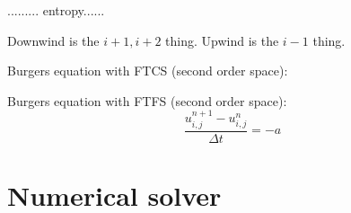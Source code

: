 \documentclass{article}
\begin{document}
......... entropy......


Downwind is the $i+1, i+2$ thing. Upwind is the $i-1$ thing.


Burgers equation with FTCS (second order space):

Burgers equation with FTFS (second order space):
\begin{equation}
    \frac{u_{i,j}^{n+1}-u_{i,j}^n}{\Delta t} = -a \frac{}{}
\end{equation}



\section{Numerical solver}







\end{document}
